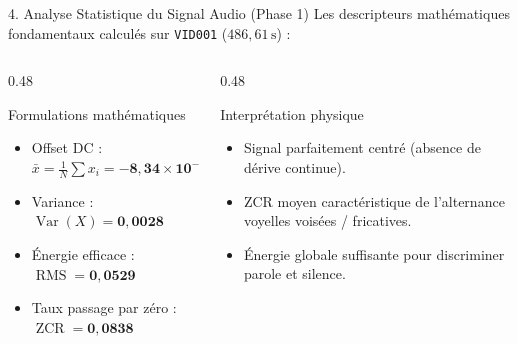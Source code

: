 \documentclass[aspectratio=169,10pt]{beamer}
\begin{document}
\begin{frame}{4. Analyse Statistique du Signal Audio (Phase 1)}
Les descripteurs mathématiques fondamentaux calculés sur \texttt{VID001} ($486{,}61\,\text{s}$) :

\vspace{0.2cm}
\begin{columns}[T]
    \begin{column}{0.48\textwidth}
        \begin{block}{Formulations mathématiques}
            \begin{itemize}
                \item Offset DC : $\bar{x} = \frac{1}{N}\sum x_i = \mathbf{-8{,}34 \times 10^{-8} \approx 0}$
                \item Variance : $\operatorname{Var}(X) = \mathbf{0{,}0028}$
                \item Énergie efficace : $\operatorname{RMS} = \mathbf{0{,}0529}$
                \item Taux passage par zéro : $\operatorname{ZCR} = \mathbf{0{,}0838}$
            \end{itemize}
        \end{block}
    \end{column}
    \begin{column}{0.48\textwidth}
        \begin{block}{Interprétation physique}
            \begin{itemize}
                \item Signal parfaitement centré (absence de dérive continue).
                \item ZCR moyen caractéristique de l'alternance voyelles voisées / fricatives.
                \item Énergie globale suffisante pour discriminer parole et silence.
            \end{itemize}
        \end{block}
    \end{column}
\end{columns}
\end{frame}
\end{document}
